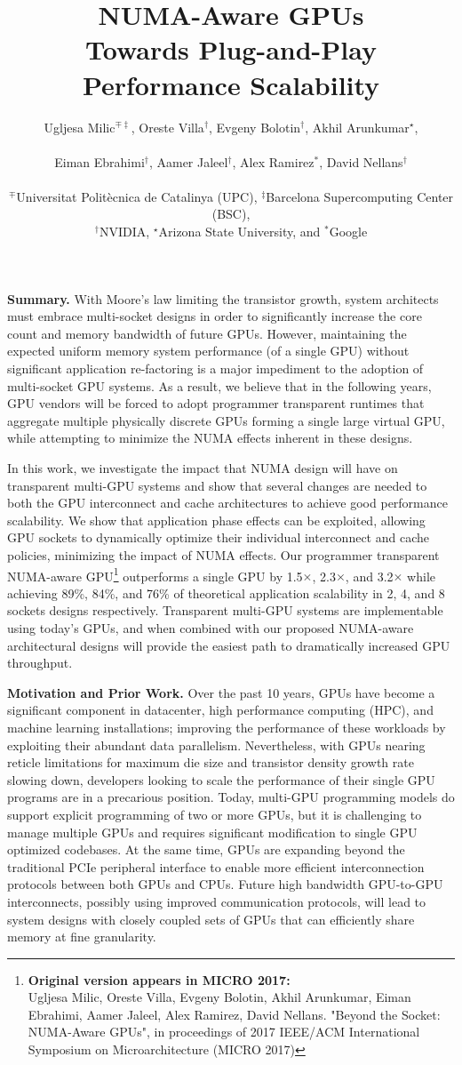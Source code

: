 \documentclass{sig-alternate}
\title{NUMA-Aware GPUs\\Towards Plug-and-Play Performance Scalability}
\author{
Ugljesa Milic$^{\mp\ddagger}$,
Oreste Villa$^{\dagger}$,
Evgeny Bolotin$^{\dagger}$,
Akhil Arunkumar$^{\star}$,\\\\
Eiman Ebrahimi$^{\dagger}$,
Aamer Jaleel$^{\dagger}$,
Alex Ramirez$^{\ast}$,
David Nellans$^{\dagger}$
\\\\
$^{\mp}$Universitat Polit\`ecnica de Catalinya (UPC), $^{\ddagger}$Barcelona Supercomputing Center (BSC), \\
$^{\dagger}$NVIDIA, $^{\star}$Arizona State University, and $^{\ast}$Google\\
}
\begin{document}
\maketitle
\pagestyle{plain}

\textbf{Summary.} With Moore's law limiting the transistor growth, system architects must
embrace multi-socket designs in order to significantly increase the core count and memory 
bandwidth of future GPUs. However, maintaining the expected uniform memory 
system performance (of a single GPU) without significant 
application re-factoring is a major impediment to the adoption of multi-socket GPU
systems. As a result, we believe that in the following years, GPU vendors will be forced to adopt programmer transparent runtimes that 
aggregate multiple physically discrete GPUs forming a single large virtual 
GPU, while attempting to minimize the NUMA effects inherent in these designs.

In this work, we investigate the impact that NUMA design will have on 
transparent multi-GPU systems and show that several changes are needed to 
both the GPU interconnect and cache architectures to achieve good performance 
scalability. We show that application phase effects can be exploited, allowing GPU sockets to dynamically optimize their individual interconnect and cache 
policies, minimizing the impact of NUMA effects. Our programmer transparent NUMA-aware 
GPU\footnote{\textbf{Original version appears in MICRO 2017:} \\ Ugljesa Milic, 
Oreste Villa, Evgeny Bolotin, Akhil Arunkumar, Eiman Ebrahimi, Aamer Jaleel, 
Alex Ramirez, David Nellans. "Beyond the Socket: NUMA-Aware GPUs", in 
proceedings of 2017 IEEE/ACM International Symposium on Microarchitecture (MICRO 
2017)} outperforms a single GPU by 1.5$\times$, 2.3$\times$, and 3.2$\times$ 
while achieving 89\%, 84\%, and 76\% of theoretical application scalability in 
2, 4, and 8 sockets designs respectively. Transparent multi-GPU systems are 
implementable using today's GPUs, and when combined with our proposed 
NUMA-aware architectural designs will provide the easiest path to 
dramatically increased GPU throughput.

\textbf{Motivation and Prior Work.} Over the past 10 years, GPUs have become a 
significant component in datacenter, high performance computing (HPC), and 
machine learning installations; improving the performance of these workloads by 
exploiting their abundant data parallelism. Nevertheless, with GPUs nearing
reticle limitations for maximum die size and transistor density growth rate 
slowing down, developers looking to scale the performance of their single GPU 
programs are in a precarious position. Today, multi-GPU programming models do 
support explicit programming of two or more GPUs, but it is challenging to 
manage multiple GPUs and requires significant modification to single 
GPU optimized codebases.  At the same time, GPUs are expanding beyond the traditional 
PCIe peripheral interface to enable more efficient interconnection protocols 
between both GPUs and CPUs. Future high bandwidth GPU-to-GPU interconnects, 
possibly using improved communication protocols, will lead to system designs 
with closely coupled sets of GPUs that can efficiently share memory at fine 
granularity.
\end{document}
